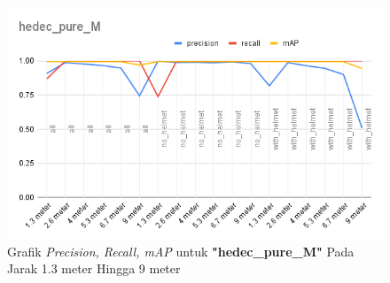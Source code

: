 \begin{enumerate}
  \begin{figure} [h!]
    \centering
    \includegraphics[width=1\textwidth]{gambar/BerdasarkanJarak/hedec_pure_M.png}
    \caption{Grafik \emph{Precision, Recall, mAP} untuk \textbf{"hedec\_pure\_M"} Pada Jarak 1.3 meter Hingga 9 meter}
    \label{fig:grafvaljarak_hedec_pure_M}  
  \end{figure}


\end{enumerate}

